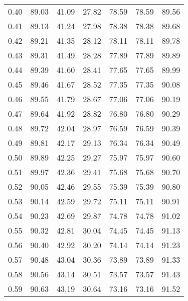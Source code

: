 \begin{tabular}{|c|c|c|c|c|c|c|}
      0.40 &     89.03 &     41.09 &      27.82 &   78.59 &      78.59 &         89.56 \\
      0.41 &     89.13 &     41.24 &      27.98 &   78.38 &      78.38 &         89.68 \\
      0.42 &     89.21 &     41.35 &      28.12 &   78.11 &      78.11 &         89.78 \\
      0.43 &     89.31 &     41.49 &      28.28 &   77.89 &      77.89 &         89.89 \\
      0.44 &     89.39 &     41.60 &      28.41 &   77.65 &      77.65 &         89.99 \\
      0.45 &     89.46 &     41.67 &      28.52 &   77.35 &      77.35 &         90.08 \\
      0.46 &     89.55 &     41.79 &      28.67 &   77.06 &      77.06 &         90.19 \\
      0.47 &     89.64 &     41.92 &      28.82 &   76.80 &      76.80 &         90.29 \\
      0.48 &     89.72 &     42.04 &      28.97 &   76.59 &      76.59 &         90.39 \\
      0.49 &     89.81 &     42.17 &      29.13 &   76.34 &      76.34 &         90.49 \\
      0.50 &     89.89 &     42.25 &      29.27 &   75.97 &      75.97 &         90.60 \\
      0.51 &     89.97 &     42.36 &      29.41 &   75.68 &      75.68 &         90.70 \\
      0.52 &     90.05 &     42.46 &      29.55 &   75.39 &      75.39 &         90.80 \\
      0.53 &     90.14 &     42.59 &      29.72 &   75.11 &      75.11 &         90.91 \\
      0.54 &     90.23 &     42.69 &      29.87 &   74.78 &      74.78 &         91.02 \\
      0.55 &     90.32 &     42.81 &      30.04 &   74.45 &      74.45 &         91.13 \\
      0.56 &     90.40 &     42.92 &      30.20 &   74.14 &      74.14 &         91.23 \\
      0.57 &     90.48 &     43.04 &      30.36 &   73.89 &      73.89 &         91.33 \\
      0.58 &     90.56 &     43.14 &      30.51 &   73.57 &      73.57 &         91.43 \\
      0.59 &     90.63 &     43.19 &      30.64 &   73.16 &      73.16 &         91.52 \\

\end{tabular}
